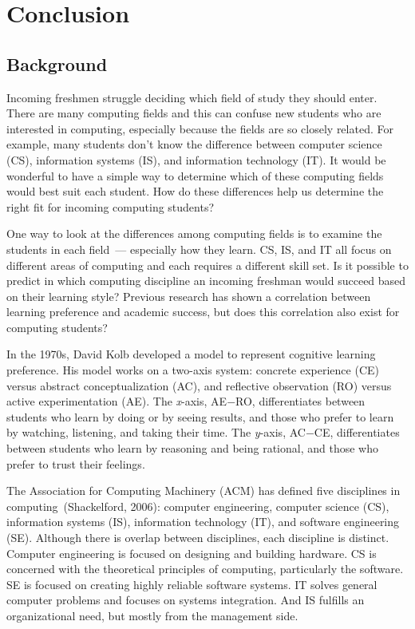 \chapter{Conclusion}\label{chp:chapter5}
\section{Background}
Incoming freshmen struggle deciding which field of study they should enter. There are many computing fields and this can confuse new students who are interested in computing, especially because the fields are so closely related. For example, many students don't know the difference between computer science (CS), information systems (IS), and information technology (IT). It would be wonderful to have a simple way to determine which of these computing fields would best suit each student. How do these differences help us determine the right fit for incoming computing students?

One way to look at the differences among computing fields is to examine the students in each field~--- especially how they learn. CS, IS, and IT all focus on different areas of computing and each requires a different skill set. Is it possible to predict in which computing discipline an incoming freshman would succeed based on their learning style? Previous research has shown a correlation between learning preference and academic success, but does this correlation also exist for computing students?

In the 1970s, David Kolb developed a model to represent cognitive learning preference. His model works on a two-axis system: concrete experience (CE) versus abstract conceptualization (AC), and reflective observation (RO) versus active experimentation (AE). The \textit{x}-axis, AE$-$RO, differentiates between students who learn by doing or by seeing results, and those who prefer to learn by watching, listening, and taking their time. The \textit{y}-axis, AC$-$CE, differentiates between students who learn by reasoning and being rational, and those who prefer to trust their feelings.

The Association for Computing Machinery (ACM) has defined five disciplines in computing~(Shackelford, 2006): computer engineering, computer science (CS), information systems (IS), information technology (IT), and software engineering (SE). Although there is overlap between disciplines, each discipline is distinct. Computer engineering is focused on designing and building hardware. CS is concerned with the theoretical principles of computing, particularly the software. SE is focused on creating highly reliable software systems. IT solves general computer problems and focuses on systems integration. And IS fulfills an organizational need, but mostly from the management side.

